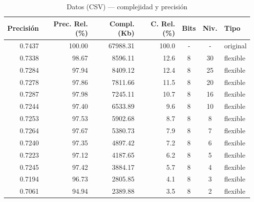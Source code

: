 {\footnotesize
\begin{table}[H]
    \centering
    \caption{Datos (CSV) — complejidad y precisión}
    \begin{tabular}{@{}r r r r c c l@{}}
        \toprule
        Precisión & Prec. Rel. (\%) & Compl. (Kb) & C. Rel. (\%) & Bits & Niv. & Tipo \\
        \midrule
        \rowcolor{gray!20}
        0.7437 & 100.00 & 67988.31 & 100.0 & \texttt{-} & \texttt{-} & original \\
        0.7338 & 98.67 & 8596.11  & 12.6  & 8 & 30 & flexible \\
        0.7284 & 97.94 & 8409.12  & 12.4  & 8 & 25 & flexible \\
        0.7278 & 97.86 & 7811.66  & 11.5  & 8 & 20 & flexible \\
        0.7287 & 97.98 & 7245.11  & 10.7  & 8 & 16 & flexible \\
        0.7244 & 97.40 & 6533.89  & 9.6   & 8 & 10 & flexible \\
        0.7253 & 97.53 & 5902.68  & 8.7   & 8 & 8  & flexible \\
        0.7264 & 97.67 & 5380.73  & 7.9   & 8 & 7  & flexible \\
        0.7240 & 97.35 & 4897.42  & 7.2   & 8 & 6  & flexible \\
        0.7223 & 97.12 & 4187.65  & 6.2   & 8 & 5  & flexible \\
        0.7245 & 97.42 & 3884.17  & 5.7   & 8 & 4  & flexible \\
        0.7194 & 96.73 & 2805.85  & 4.1   & 8 & 3  & flexible \\
        0.7061 & 94.94 & 2389.88  & 3.5   & 8 & 2  & flexible \\
        \bottomrule
    \end{tabular}
    \label{tab:csv_results}
\end{table}
}

